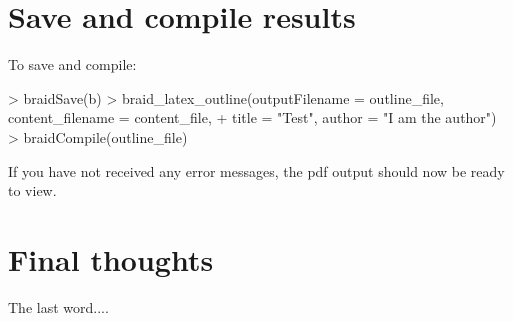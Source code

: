 \documentclass[a4paper]{article}
\begin{document}
\section{Save and compile results}

To save and compile:

\begin{Schunk}
\begin{Sinput}
> braidSave(b)
> braid_latex_outline(outputFilename = outline_file, content_filename = content_file, 
+     title = "Test", author = "I am the author")
> braidCompile(outline_file)
\end{Sinput}
\end{Schunk}

If you have not received any error messages, the pdf output should now be ready to view.


\section{Final thoughts}

The last word....


\end{document}
